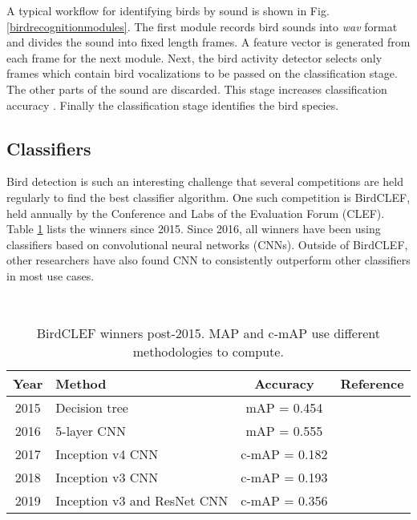 A typical workflow for identifying birds by sound is shown in Fig. \ref{birdrecognitionmodules}.
The first module records bird sounds into \textit{wav} format and divides the sound into fixed length frames.
A feature vector is generated from each frame for the next module. Next, the bird activity detector selects only frames which contain bird vocalizations to be passed on the classification stage. The other parts of the sound are discarded. This stage increases classification accuracy \cite{Stastny2018}. Finally the classification stage identifies the bird species.



\subsection{Classifiers}

Bird detection is such an interesting challenge that several competitions are held regularly to find the best classifier algorithm. 
One such competition is BirdCLEF, held annually by the Conference and Labs of the Evaluation Forum (CLEF). 
Table \ref{birdclefwinners} lists the winners since 2015.
Since 2016, all winners have been using classifiers based on convolutional neural networks (CNNs).
Outside of BirdCLEF, other researchers have also found CNN to consistently outperform other classifiers in most use cases.

\begin{table}[h]
\renewcommand{\arraystretch}{.75}
\caption{BirdCLEF winners post-2015. MAP and c-mAP use different methodologies to compute.}
\label{birdclefwinners}
\centering
\
\begin{tabular}{clcc}
\toprule
\textbf{Year} & \textbf{Method}	&  \textbf{Accuracy} & \textbf{Reference} \\
\midrule
2015 & Decision tree & mAP = 0.454 & \cite{Goeau2015} \\
2016 & 5-layer CNN & mAP = 0.555 & \cite{Goeau2016}\\
2017 & Inception v4 CNN & c-mAP = 0.182 & \cite{Sevilla2017}\\
2018 & Inception v3 CNN & c-mAP = 0.193 & \cite{Goeau2018} \\
2019 & Inception v3 and ResNet CNN & c-mAP = 0.356 & \cite{Kahl2019} \\
\bottomrule
\end{tabular}
\end{table}

